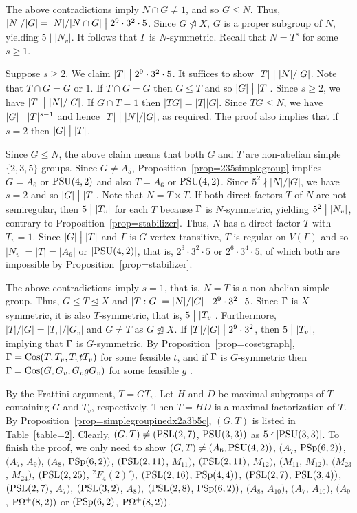 \documentclass[12pt]{article}
\def\di{\bigm|} \def\lg{\langle} \def\rg{\rangle}
\def\PSL{\hbox{\rm PSL}}\def\PSU{\hbox{\rm PSU}}
\def\PSp{\hbox{\rm PSp}}\def\P\GammaL{\hbox{\rm P\Gamma L}} \def\ASIL{\hbox{\rm A\Sigma L}}
\def\Cos{\hbox{\rm Cos}}
\begin{document}
The above contradictions imply $N\cap G\not=1$, and so $G\leq N$. Thus, $|N|/|G|=|N|/|N\cap G|\di 2^9\cdot 3^2\cdot 5$.
Since $G\ntrianglelefteq X$, $G$ is a proper subgroup of $N$, yielding $5\mid |N_v|$. It follows that $\Gamma$ is $N$-symmetric.
Recall that $N=T^s$ for some $s\geq 1$.

Suppose $s\geq 2$. We claim $|T|\di 2^9\cdot3^2\cdot5$. It suffices to show $|T|\di |N|/|G|$.
Note that $T\cap G=G$ or $1$. If $T\cap G=G$ then $G\leq T$ and so $|G|\di |T|$. Since $s\geq 2$,
we have $|T|\di |N|/|G|$. If $G\cap T=1$ then $|TG|=|T||G|$. Since $TG\leq N$, we have $|G|\di |T|^{s-1}$
and hence $|T|\di |N|/|G|$, as required. The proof also implies that if $s=2$ then $|G|\di |T|$.

Since $G\leq N$, the above claim means that both $G$ and $T$ are non-abelian simple $\{2,3,5\}$-groups.
Since $G\not=A_5$, Proposition~\ref{prop=235simplegroup} implies $G=A_6$ or $\PSU(4,2)$ and also $T=A_6$ or
$\PSU(4,2)$. Since $5^2\nmid |N|/|G|$, we have $s=2$ and so $|G|\di |T|$. Note that $N=T\times T$.
If both direct factors $T$ of $N$ are not semiregular, then $5\di |T_v|$ for each $T$ because $\Gamma$ is $N$-symmetric,
yielding $5^2\di |N_v|$, contrary to Proposition~\ref{prop=stabilizer}. Thus, $N$ has a direct factor $T$ with $T_v=1$.
Since $|G|\di |T|$ and $\Gamma$ is $G$-vertex-transitive, $T$ is regular on $V(\Gamma)$ and so $|N_v|=|T|=|A_6|$ or $|\PSU(4,2)|$, that is, $2^3\cdot 3^2\cdot 5$ or $2^6\cdot 3^4\cdot 5$, of which both are impossible by Proposition~\ref{prop=stabilizer}.

The above contradictions imply $s=1$, that is, $N=T$ is a non-abelian simple group. Thus, $G\leq T\unlhd X$
and $|T:G|=|N|/|G|\di 2^9\cdot 3^2\cdot 5$. Since $\Gamma$ is $X$-symmetric, it is also $T$-symmetric, that is, $5\di |T_v|$. Furthermore, $|T|/|G|=|T_v|/|G_v|$ and $G\not=T$ as $G\ntrianglelefteq X$. If $|T|/|G|\di 2^9\cdot3^2$, then $5\di |T_v|$, implying that $\Gamma$ is $G$-symmetric. By Proposition~\ref{prop=cosetgraph}, $\G=\Cos(T,T_v,T_vtT_v)$ for some feasible $t$, and if $\Gamma$ is $G$-symmetric then $\G=\Cos(G,G_v,G_vgG_v)$ for some feasible $g$ .

By the Frattini argument, $T=GT_v$. Let $H$ and $D$ be maximal subgroups of $T$ containing $G$ and $T_v$, respectively.
Then $T=HD$ is a maximal factorization of $T$. By Proposition~\ref{prop=simplegroupinedx2a3b5c}, $(G,T)$ is listed in Table~\ref{table=2}. Clearly, $(G,T)\neq (\rm PSL(2,7)$, $\rm PSU(3,3))$ as $5\nmid |\rm PSU(3,3)|$.
To finish the proof, we only need to show $(G,T)\not=(A_6, \PSU(4,2))$, $(A_7$, $\PSp(6,2))$,
$(A_7$, $A_9)$, $(A_8$, $\PSp(6,2))$, $(\PSL(2,11)$, $M_{11})$, $(\PSL(2,11)$, $M_{12})$, $(M_{11}$, $M_{12})$,
$(M_{23}$, $M_{24})$, $(\PSL(2,25)$, $^2F_{4}(2)')$, $(\PSL(2,16)$, $\PSp(4,4))$, $(\PSL(2,7)$, $\PSL(3,4))$,
$(\PSL(2,7)$, $A_7)$, $(\PSL(3,2)$, $A_8)$, $(\PSL(2,8)$, $\PSp(6,2))$, $(A_8$, $A_{10})$, $(A_7$, $A_{10})$,
$(A_9$, $\rm P\Omega^+(8,2))$ or $(\rm PSp(6,2)$, $\rm P\Omega^+(8,2))$.
\end{document}
